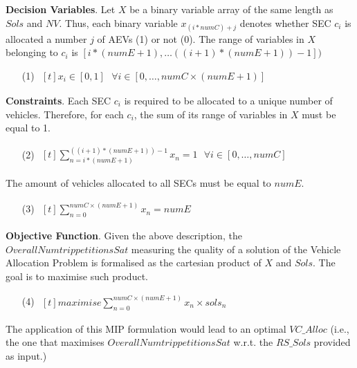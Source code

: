 \textbf{Decision Variables}. Let $X$ be a binary variable array of the same length as $Sols$ and $NV$.
                             Thus, each binary variable $x_{(i * numC) + j}$ denotes whether SEC $c_i$ is
                             allocated a number $j$ of AEVs (1) or not (0).
                             The range of variables in $X$ belonging to $c_i$ is $[i * (numE + 1), \ldots ((i+1) * (numE + 1))-1])$
\begin{enumerate}
\item[(1)] $\begin{aligned}[t]
    x_i \in [0, 1] \ \ \ \forall i\in [0, \ldots, numC \times (numE + 1)]
\end{aligned}$
\end{enumerate}

\textbf{Constraints}. Each SEC $c_i$ is required to be allocated to a unique number of vehicles. Therefore,
                      for each $c_i$, the sum of its range of variables in $X$ must be equal to 1.
\begin{enumerate}
\item[(2)] $\begin{aligned}[t]
    \sum_{n=i * (numE + 1)}^{((i+1) * (numE + 1))-1} x_n = 1 \ \ \ \forall i\in [0, \ldots, numC]
\end{aligned}$
\end{enumerate}
The amount of vehicles allocated to all SECs must be equal to $numE$.
\begin{enumerate}
\item[(3)] $\begin{aligned}[t]
    \sum_{n=0}^{numC \times (numE + 1)} x_n = numE
\end{aligned}$
\end{enumerate}

\textbf{Objective Function}. Given the above description, the $OverallNumtrip petitionsSat$ measuring the quality of a solution of
the Vehicle Allocation Problem is formalised as the cartesian product of $X$ and $Sols$. The goal
                            is to maximise such product.
\begin{enumerate}
\item[(4)] $\begin{aligned}[t]
    maximise \sum_{n=0}^{numC \times (numE + 1)} x_n \times sols_n
\end{aligned}$
\end{enumerate}

The application of this MIP formulation would lead to an optimal $VC\_Alloc$
(i.e., the one that maximises $OverallNumtrip petitionsSat$ w.r.t. the $RS\_Sols$ provided as input.)

